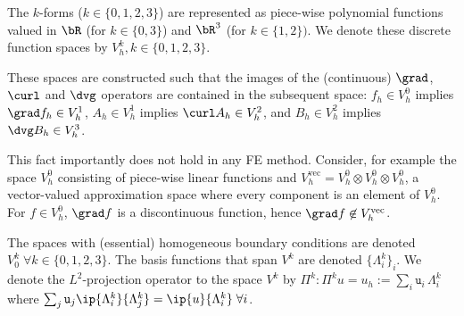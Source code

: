 \documentclass[%
 reprint,
 superscriptaddress,
 amsmath,amssymb,
 aps, nofootinbib, floatfix]{revtex4-2}
\begin{document}
The $k$-forms ($k \in \{0, 1, 2, 3 \}$) are represented as piece-wise polynomial functions valued in $\bR$ (for $k \in \{0, 3\}$) and $\bR^3$ (for $k \in \{1,2\})$. We denote these discrete function spaces by $V^k_h, k \in \{0, 1, 2, 3\}$. 

These spaces are constructed such that the images of the (continuous) $\grad$, $\curl$ and $\dvg$ operators are contained in the subsequent space: $f_h \in V^0_h$ implies $\grad f_h \in V^1_h$, $A_h \in V^1_h$ implies $\curl A_h \in V^2_h$, and $B_h \in V^2_h$ implies $\dvg B_h \in V^3_h$.

\begin{example}
    This fact importantly does not hold in any FE method. Consider, for example the space $V^0_h$ consisting of piece-wise linear functions and $V^{\mathrm{vec}}_h = V^0_h \otimes V^0_h \otimes V^0_h$, a vector-valued approximation space where every component is an element of $V^0_h$. For $f \in V^0_h$, $\grad f$ is a discontinuous function, hence $\grad f \not \in V^{\mathrm{vec}}_h$.
\end{example}

The spaces with (essential) homogeneous boundary conditions are denoted $V^k_0 \; \forall k \in \{0,1,2,3\}$.
%
The basis functions that span $V^k$ are denoted $\{ \Lambda^k_i \}_i$. We denote the $L^2$-projection operator to the space $V^k$ by $\Pi^k : \Pi^k u = u_h := \sum_i \mathtt{u}_i \, \Lambda^k_i$ {where} $\sum_j \mathtt{u}_j \ip{\Lambda_i^k}{\Lambda_j^k} = \ip{u}{\Lambda^k_i} \; \forall i$.   
\end{document}
